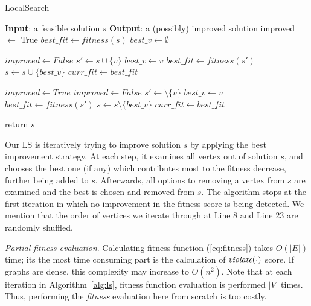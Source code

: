 \documentclass[sigconf]{acmart}
\begin{document}
  
  \begin{algorithm}[!t] 
  	\caption{LocalSearch}\label{alg:ls}
  	\begin{algorithmic}[1]
  		\STATE \textbf{Input}: a feasible solution $s$
  		\STATE \textbf{Output}: a (possibly) improved solution
  		\STATE improved $\gets$ True
  		\STATE $best\_fit \gets fitness(s)$
  		\STATE $best\_v \gets \emptyset$
 
  		     \STATE $improved \gets  False$
  		          \STATE $s' \gets s \cup \{v\}$
  		              \STATE $best\_v \gets v$
  		              \STATE $best\_fit \gets fitness(s')$
  		          \ENDIF
  		     \ENDFOR
  		         \STATE $s \gets s \cup \{best\_v\}$
  		         \STATE $curr\_fit \gets best\_fit$
  		     \ENDIF

  		\ENDWHILE   		    
  		 \STATE  $improved \gets True$
  		   \STATE $improved \gets  False$
  		       \STATE $s' \gets \setminus \{v\}$
  		             \STATE $best\_v \gets v$
  		             \STATE $best\_fit \gets fitness(s')$
  		       \ENDIF
  		       \STATE $s \gets s \setminus \{best\_v\}$
  		       \STATE $curr\_fit \gets best\_fit$
  		       \ENDIF
  		       
  		    \ENDFOR
  		\ENDWHILE
  		\STATE return $s$
  	\end{algorithmic}
\end{algorithm}

Our LS is iteratively trying to improve solution $s$ by applying the best improvement strategy. At each step, it examines all vertex out of solution $s$, and chooses the best one (if any) which contributes most to the fitness decrease, further being added to $s$. Afterwards, all options to removing a vertex from $s$ are examined and the best is chosen and   removed from $s$.   The algorithm stops at the first iteration  in which no improvement in the fitness score is being detected.  We mention that the order of vertices we iterate through at Line 8 and Line 23 are randomly shuffled. 

\emph{Partial fitness evaluation}. Calculating fitness function (\ref{eq:fitness}) takes $O(|E|)$ time; its the most time consuming part is the calculation of $\emph{violate}(\cdot)$  score.   If graphs are dense, this complexity may increase to  $O(n^2)$. Note that at each iteration in Algorithm~\ref{alg:ls},  fitness function evaluation is performed $|V|$ times. Thus, performing the \emph{fitness} evaluation here from scratch is too costly. 
\end{document}
